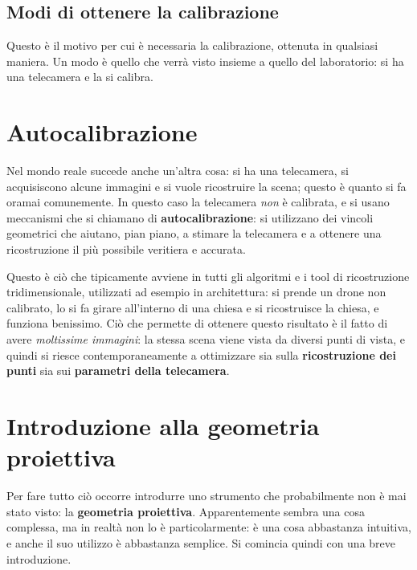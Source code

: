 \subsection{Modi di ottenere la calibrazione}

Questo è il motivo per cui è necessaria la calibrazione, ottenuta in qualsiasi maniera. Un modo è quello che verrà visto insieme a quello del laboratorio: si ha una telecamera e la si calibra.

\section{Autocalibrazione}

Nel mondo reale succede anche un'altra cosa: si ha una telecamera, si acquisiscono alcune immagini e si vuole ricostruire la scena; questo è quanto si fa oramai comunemente. In questo caso la telecamera \emph{non} è calibrata, e si usano meccanismi che si chiamano di \textbf{autocalibrazione}: si utilizzano dei vincoli geometrici che aiutano, pian piano, a stimare la telecamera e a ottenere una ricostruzione il più possibile veritiera e accurata.

Questo è ciò che tipicamente avviene in tutti gli algoritmi e i tool di ricostruzione tridimensionale, utilizzati ad esempio in architettura: si prende un drone non calibrato, lo si fa girare all'interno di una chiesa e si ricostruisce la chiesa, e funziona benissimo. Ciò che permette di ottenere questo risultato è il fatto di avere \emph{moltissime immagini}: la stessa scena viene vista da diversi punti di vista, e quindi si riesce contemporaneamente a ottimizzare sia sulla \textbf{ricostruzione dei punti} sia sui \textbf{parametri della telecamera}.

\section{Introduzione alla geometria proiettiva}

Per fare tutto ciò occorre introdurre uno strumento che probabilmente non è mai stato visto: la \textbf{geometria proiettiva}. Apparentemente sembra una cosa complessa, ma in realtà non lo è particolarmente: è una cosa abbastanza intuitiva, e anche il suo utilizzo è abbastanza semplice. Si comincia quindi con una breve introduzione.

